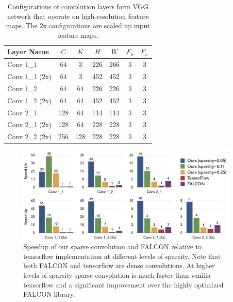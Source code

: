 \documentclass{article}
\begin{document}
\begin{table}[t]\centering
\small
\begin{tabularx}{0.75\textwidth}{Xcccccc}\toprule
    Layer Name & $C$ & $K$ & $H$ & $W$ & $F_h$ & $F_w$\\ \midrule 
    Conv 1\_1 & 64 & 3 & 226 & 266 & 3  & 3 \\
    Conv 1\_1 (2x) & 64 & 3 & 452 & 452 & 3  & 3 \\
    Conv 1\_2  & 64 & 64 & 226 & 226 & 3  & 3 \\
    Conv 1\_2 (2x) & 64 & 64 & 452 & 452 & 3  & 3 \\
    Conv 2\_1  & 128 & 64 & 114 & 114 & 3  & 3 \\
    Conv 2\_1 (2x) & 128 & 64 & 228 & 228 & 3  & 3 \\
    Conv 2\_2 (2x) & 256 & 128 & 228 & 228 & 3  & 3 \\
    \bottomrule
\end{tabularx}
    \vspace{1em}
    \caption{Configurations of convolution layers form VGG network that operate
    on high-resolution feature maps. The 2x configurations are scaled up input
    feature maps.}
\label{tab:conv_config}
\end{table}


\begin{figure}[t]
	\centering
	\includegraphics[width=\textwidth]{falcon_tf}
    \caption{Speedup of our sparse convolution and FALCON relative to
    tensorflow implementation at different levels of sparsity. Note that both
    FALCON and tensorflow are dense convolutions. At higher levels of sparsity
    sparse convolution is much faster than vanilla tensorflow and a significant
    improvement over the highly optimized FALCON library.}
\label{fig:falcon_tf}
\end{figure}
\end{document}
